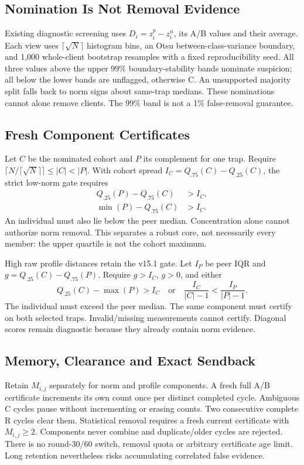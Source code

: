 \documentclass[conference]{IEEEtran}
\begin{document}
\subsection{Nomination Is Not Removal Evidence}
Existing diagnostic screening uses $D_i=z_i^p-z_i^n$, its A/B values and their
average. Each view uses $\lceil\sqrt N\rceil$ histogram bins, an Otsu
between-class-variance boundary, and 1,000 whole-client bootstrap resamples with
a fixed reproducibility seed. All three values above the upper 99\%
boundary-stability bands nominate suspicion; all below the lower bands are
unflagged, otherwise C. An unsupported majority split falls back to norm signs
about same-trap medians. These nominations cannot alone remove clients. The
99\% band is not a 1\% false-removal guarantee.

\subsection{Fresh Component Certificates}
Let $C$ be the nominated cohort and $P$ its complement for one trap. Require
$\lceil N/\lceil\sqrt N\rceil\rceil\leq |C|<|P|$. With cohort spread
$I_C=Q_{.75}(C)-Q_{.25}(C)$, the strict low-norm gate requires
\begin{align}
 Q_{.25}(P)-Q_{.75}(C)&>I_C,\\
 \min(P)-Q_{.75}(C)&>I_C.
\end{align}
An individual must also lie below the peer median. Concentration alone cannot
authorize norm removal. This separates a robust core, not necessarily every
member: the upper quartile is not the cohort maximum.

High raw profile distances retain the v15.1 gate. Let $I_P$ be peer IQR and
$g=Q_{.25}(C)-Q_{.75}(P)$. Require $g>I_C$, $g>0$, and either
\begin{equation}
 Q_{.25}(C)-\max(P)>I_C
 \quad\text{or}\quad
 \frac{I_C}{|C|-1}<\frac{I_P}{|P|-1}.
\end{equation}
The individual must exceed the peer median. The same component must certify
on both selected traps. Invalid/missing measurements cannot certify. Diagonal
scores remain diagnostic because they already contain norm evidence.

\subsection{Memory, Clearance and Exact Sendback}
Retain $M_{i,j}$ separately for norm and profile components. A fresh full A/B
certificate increments its own count once per distinct completed cycle.
Ambiguous C cycles pause without incrementing or erasing counts. Two consecutive
complete R cycles clear them. Statistical removal requires a fresh current
certificate with $M_{i,j}\geq2$. Components never combine and duplicate/older
cycles are rejected. There is no round-30/60 switch, removal quota or arbitrary
certificate age limit. Long retention nevertheless risks accumulating
correlated false evidence.
\end{document}
